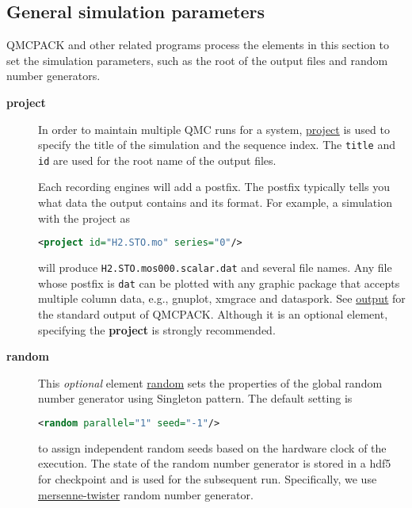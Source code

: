 \subsection{General simulation parameters}

QMCPACK and other related programs process the elements in this section to set
the simulation parameters, such as the root of the output files and random
number generators. 

\begin{description}
\item[\textbf{project}{}]\label{project.sec}
In order to maintain multiple QMC runs for a system,
\hyperlink{project.element}{project} is used to specify the title of the
simulation and the sequence index. The \texttt{title} and \texttt{id} are used
for the root name of the output files. 
 
Each recording engines will add a postfix. The postfix typically tells you what
data the output contains and its format.  For example, a simulation with the
project as
\begin{lstlisting}[language=XML,emph={project},emphstyle=\bfseries\color{blue}]
  <project id="H2.STO.mo" series="0"/>
\end{lstlisting} 
will produce \nolinkurl{H2.STO.mos000.scalar.dat} and several file names. Any
file whose postfix is \nolinkurl{dat} can be plotted with any graphic package
that accepts multiple column data, e.g., gnuplot, xmgrace and dataspork. See
\hyperlink{output.sec}{output} for the standard output of QMCPACK.  Although it
is an optional element, specifying the \textbf{project} is strongly
recommended.


\item[\textbf{random}{}]
This \emph{optional} element \hyperlink{random.element}{random} sets the
properties of the global random number generator using Singleton pattern. The
default setting is
  
\begin{lstlisting}[language=XML,emph={random},emphstyle=\bfseries\color{blue}]
  <random parallel="1" seed="-1"/>
\end{lstlisting}
 to assign independent random seeds based on the hardware clock of the
 execution. The state of the random number generator is stored in a hdf5 for
 checkpoint and is used for the subsequent run.  Specifically, we use
 \href{http://www.boost.org/boost/random/mersenne_twister.hpp}{
 mersenne-{}twister} random number generator.
\end{description}
   
